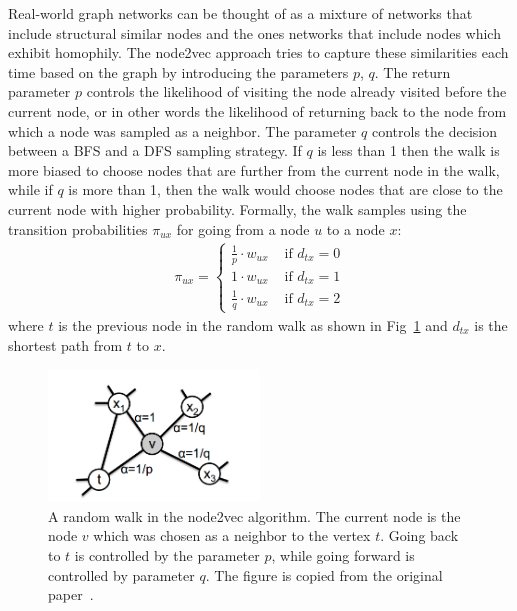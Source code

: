 Real-world graph networks can be thought of as a mixture of networks that
include structural similar nodes and the ones networks that include nodes which
exhibit homophily. The node2vec approach tries to capture these similarities each
time based on the graph by introducing the parameters $p$, $q$. The return parameter $p$ controls the
likelihood of visiting the node already visited before the current node, or in
other words the likelihood of returning back to the node from which a node was
sampled as a neighbor. The parameter $q$ controls the decision between a BFS and
a DFS sampling strategy. If $q$ is less than 1 then the walk is more biased
to choose nodes that are further from the current node in the walk, while if $q$
is more than 1, then the walk would choose nodes that are close to the current
node with higher probability. Formally, the walk samples using the transition
probabilities $\pi_{ux}$ for going from a node $u$ to a node $x$:
\begin{align}
\pi_{ux} = \begin{cases} \frac{1}{p}\cdot w_{ux} & \text{ if } d_{tx} = 0 \\
1\cdot w_{ux} & \text{ if } d_{tx} = 1 \\
\frac{1}{q}\cdot w_{ux} & \text{ if } d_{tx} = 2
\end{cases}
\end{align}
where $t$ is the previous node in the random walk as shown in
Fig~\ref{node2vec_png} and $d_{tx}$ is the shortest path from $t$ to $x$.
\begin{figure}
\begin{center}
\includegraphics[width=0.5\textwidth]{figures/node2vec.png}
\end{center}
\label{node2vec_png}
\caption{A random walk in the node2vec algorithm. The current node is the node
$v$ which was chosen as a neighbor to the vertex $t$.
Going back to $t$ is controlled by the parameter $p$, while going forward is
controlled by parameter $q$. The figure is copied from the original
paper~\cite{grover2016node2vec}.}
\end{figure}

